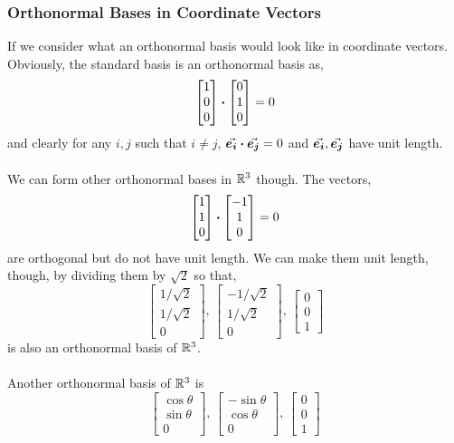 \documentclass[MathsNotesBase.tex]{subfiles}
\begin{document}
{		\subsubsection{Orthonormal Bases in Coordinate Vectors} 
		If we consider what an orthonormal basis would look like in coordinate vectors. Obviously, the standard basis is an orthonormal basis as,
			\[ \begin{bmatrix}1\\0\\0\end{bmatrix} \boldsymbol{\cdot} \begin{bmatrix}0\\1\\0\end{bmatrix} = 0 \]
			and clearly for any ${ i,j }$ such that ${ i \neq j }$, ${ \vec{\bm{e_i}} \boldsymbol{\cdot} \vec{\bm{e_j}} = 0 }$ and ${\vec{\bm{e_i}}, \vec{\bm{e_j}} }$ have unit length.\\\\
			We can form other orthonormal bases in $\mathbb{R}^{3}$ though. The vectors,
			\[ \begin{bmatrix}1\\1\\0\end{bmatrix} \boldsymbol{\cdot} \begin{bmatrix}-1\\1\\0\end{bmatrix} = 0 \]
			are orthogonal but do not have unit length. We can make them unit length, though, by dividing them by $\sqrt{2}$ so that,
			\[ \begin{bmatrix}1/\sqrt{2}\\1/\sqrt{2}\\0\end{bmatrix},\, \begin{bmatrix}-1/\sqrt{2}\\1/\sqrt{2}\\0\end{bmatrix},\, \begin{bmatrix}0\\0\\1\end{bmatrix} \]
			is also an orthonormal basis of $\mathbb{R}^{3}$.\\\\
			Another orthonormal basis of $\mathbb{R}^{3}$ is
			\[ \begin{bmatrix}\cos\theta\\\sin\theta\\0\end{bmatrix},\, \begin{bmatrix}-\sin\theta\\\cos\theta\\0\end{bmatrix},\, \begin{bmatrix}0\\0\\1\end{bmatrix} \]
}
\end{document}
